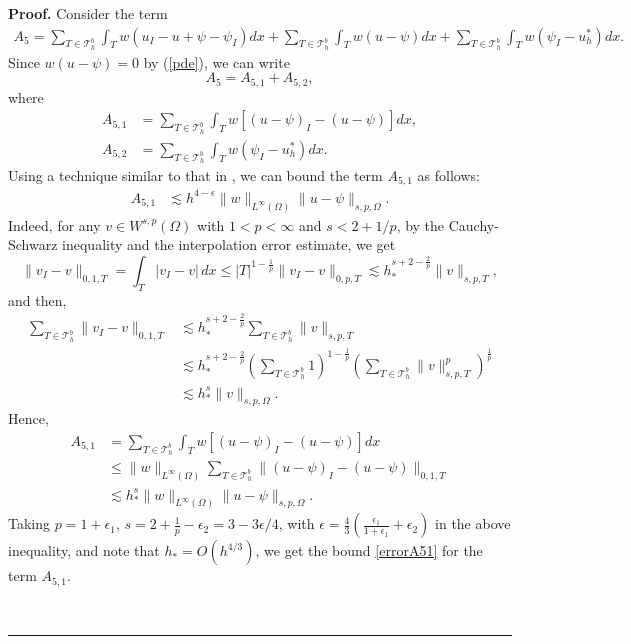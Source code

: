 \documentclass[12pt]{article}
\newenvironment{proof}[1][Proof]{\textbf{#1.} }
{\ \rule{0.75em}{0.75em}\smallskip}
\begin{document}
\begin{proof}
Consider the term 
\begin{align*}
A_5=\sum_{T\in \mathcal{T}_h^b} \int_T w (u_I-u+\psi-\psi_I)dx 
+ \sum_{T\in \mathcal{T}_h^b} \int_T w (u-\psi)dx
  +\sum_{T\in \mathcal{T}_h^b} \int_T w (\psi_I-u_h^*)dx.
\end{align*}
Since $w (u-\psi)=0$ by (\ref{pde}), we can write
\[ A_5=A_{5,1}+A_{5,2},\]
where
\begin{align*}
A_{5,1}&=\sum_{T\in \mathcal{T}_h^b} \int_T  w [(u-\psi)_I-(u-\psi)]dx,\\
A_{5,2}&=\sum_{T\in \mathcal{T}_h^b} \int_T w (\psi_I-u_h^*)dx.
\end{align*}
Using a technique similar to that in \cite{brezzi77}, we can bound the
term $A_{5,1}$ as follows:
\begin{align}
A_{5,1} &\lesssim  h^{4-\epsilon} \|w\|_{L^\infty(\Omega)} \|u-\psi\|_{s,p,\Omega}. \label{errorA51}
\end{align}
Indeed, for any $v\in W^{s,p}(\Omega)$ with $1<p<\infty$ and $s<2+1/p$, by the Cauchy-Schwarz 
inequality and the interpolation error estimate, we get 
\[\|v_I-v\|_{0,1,T} = \int_T |v_I-v|\, dx \leq |T|^{1-\frac{1}{p}} \|v_I-v\|_{0,p,T}
\lesssim h_*^{s+2-\frac{2}{p}}\|v\|_{s,p,T}, \]
and then,
\begin{align*}
\sum_{T\in \mathcal{T}_h^b} \|v_I-v\|_{0,1,T} 
& \lesssim h_*^{s+2-\frac{2}{p}} \sum_{T\in \mathcal{T}_h^b} \|v\|_{s,p,T} \\
& \lesssim h_*^{s+2-\frac{2}{p}} \left(\sum_{T\in \mathcal{T}_h^b} 1\right)^{1-\frac{1}{p}}
  \left(\sum_{T\in \mathcal{T}_h^b} \|v\|_{s,p,T}^p\right)^{\frac{1}{p}}\\
& \lesssim h_*^s \|v\|_{s,p,\Omega}. 
\end{align*}
Hence,
\begin{align*}
A_{5,1}&=\sum_{T\in \mathcal{T}_h^b} \int_T  w [(u-\psi)_I-(u-\psi)]dx\\ 
& \leq \|w\|_{L^\infty(\Omega)} \sum_{T\in \mathcal{T}_h^b} \|(u-\psi)_I-(u-\psi)\|_{0,1,T} \\
& \lesssim h_*^s \|w\|_{L^\infty(\Omega)} \|u-\psi\|_{s,p,\Omega}. 
\end{align*}
Taking $p = 1 + \epsilon_1$, $s = 2 + \frac{1}{p} - \epsilon_2 = 3 - 3\epsilon/4$, with 
$\epsilon = \frac{4}{3}\left(\frac{\epsilon_1}{1+\epsilon_1} + \epsilon_2\right)$ in the 
above inequality, and note that $h_*=O(h^{4/3})$, we get the bound \eqref{errorA51}
for the term $A_{5,1}$.


\end{proof}
\end{document}
